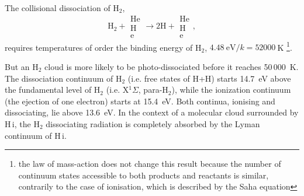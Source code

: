 %
%
%
%
%






The collisional dissociation of  H$_2$,
\[\mathrm{H}_2 + \begin{array}{c}\mathrm{He}\\\mathrm{H}\\\mathrm{e}
\end{array} \rightarrow 2\mathrm{H} +  \begin{array}{c}\mathrm{He}\\\mathrm{H}\\\mathrm{e}
\end{array},\] requires temperatures of order the binding energy of  H$_2$, $4\mathrm{.}48~\mathrm{eV}/k = 52000~$K
\footnote{the  law of mass-action does not change this
result because the number of continuum states accessible to both
products and reactants is similar, contrarily to the case of
ionisation, which is described by the Saha equation}.

But an H$_2$ cloud is more likely to be photo-dissociated before it
reaches 50\,000~K. The dissociation continuum of H$_2$ (i.e. free
states of H+H) starts 14.7~eV above the fundamental level of H$_2$
(i.e. X$^{1}\Sigma$, para-H$_2$), while the ionization continuum (the
ejection of one electron) starts at 15.4~eV. Both continua, ionising
and dissociating, lie above 13.6~eV. In the context of a molecular
cloud surrounded by H\,{\sc i}, the H$_2$ dissociating radiation is
completely absorbed by the Lyman continuum of H\,{\sc i}.

